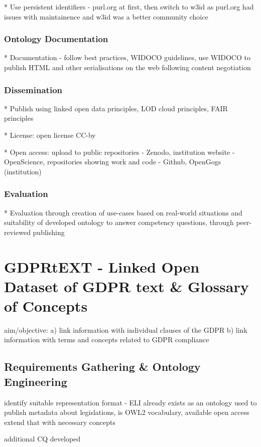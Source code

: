 * Use persistent identifiers - purl.org at first, then switch to w3id as purl.org had issues with maintainence and w3id was a better community choice

\subsubsection*{Ontology Documentation}
* Documentation - follow best practices, WIDOCO guidelines, use WIDOCO to publish HTML and other serialisations on the web following content negotiation

\subsubsection*{Dissemination}
* Publish using linked open data principles, LOD cloud principles, FAIR principles

* License: open license CC-by

* Open access: upload to public repositories - Zenodo, institution website - OpenScience, repositories showing work and code - Github, OpenGogs (institution)

\subsubsection*{Evaluation}
* Evaluation through creation of use-cases based on real-world situations and suitability of developed ontology to answer competency questions, through peer-reviewed publishing

\section{GDPRtEXT - Linked Open Dataset of GDPR text \& Glossary of Concepts}\label{sec:voc:GDPRtEXT}
aim/objective: 
a) link information with individual clauses of the GDPR
b) link information with terms and concepts related to GDPR compliance

\subsection{Requirements Gathering \& Ontology Engineering}
identify suitable representation format - ELI already exists as an ontology used to publish metadata about legislations, is OWL2 vocabulary, available open access
extend that with necessary concepts

additional CQ developed

